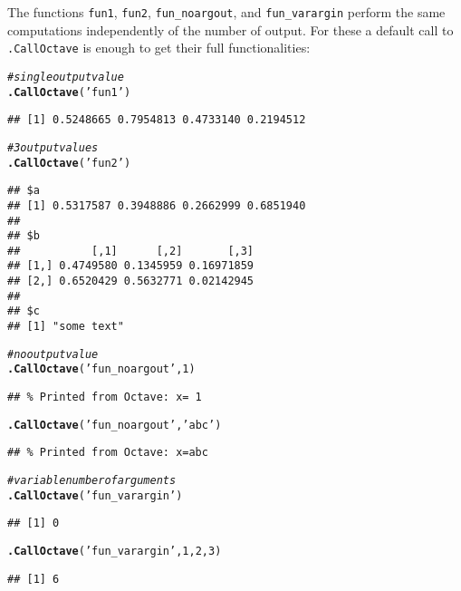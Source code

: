 \documentclass[english,10pt,a4paper]{article}\usepackage[]{graphicx}\usepackage[]{color}
\makeatletter
\newcommand{\hlnum}[1]{\textcolor[rgb]{0.686,0.059,0.569}{#1}}%
\newcommand{\hlstr}[1]{\textcolor[rgb]{0.192,0.494,0.8}{#1}}%
\newcommand{\hlcom}[1]{\textcolor[rgb]{0.678,0.584,0.686}{\textit{#1}}}%
\newcommand{\hlstd}[1]{\textcolor[rgb]{0.345,0.345,0.345}{#1}}%
\newcommand{\hlkwd}[1]{\textcolor[rgb]{0.737,0.353,0.396}{\textbf{#1}}}%
\newenvironment{kframe}{%
 \def\at@end@of@kframe{}%
 \ifinner\ifhmode%
  \def\at@end@of@kframe{\end{minipage}}%
  \begin{minipage}{\columnwidth}%
 \fi\fi%
 \def\FrameCommand##1{\hskip\@totalleftmargin \hskip-\fboxsep
 \colorbox{shadecolor}{##1}\hskip-\fboxsep
     \hskip-\linewidth \hskip-\@totalleftmargin \hskip\columnwidth}%
 \MakeFramed {\advance\hsize-\width
   \@totalleftmargin\z@ \linewidth\hsize
   \@setminipage}}%
 {\par\unskip\endMakeFramed%
 \at@end@of@kframe}
\newenvironment{knitrout}{}{} %
\let\code=\texttt
\makeatother
\begin{document}
The functions \code{fun1}, \code{fun2}, \code{fun\_noargout}, and
\code{fun\_varargin} perform the same computations independently of the number
of output.
For these a default call to \code{.CallOctave} is enough to get their full
functionalities:

\begin{knitrout}
\color{fgcolor}\begin{kframe}
\begin{alltt}
\hlcom{# single output value}
\hlkwd{.CallOctave}\hlstd{(}\hlstr{'fun1'}\hlstd{)}
\end{alltt}
\begin{verbatim}
## [1] 0.5248665 0.7954813 0.4733140 0.2194512
\end{verbatim}
\begin{alltt}
\hlcom{# 3 output values }
\hlkwd{.CallOctave}\hlstd{(}\hlstr{'fun2'}\hlstd{)}
\end{alltt}
\begin{verbatim}
## $a
## [1] 0.5317587 0.3948886 0.2662999 0.6851940
## 
## $b
##           [,1]      [,2]       [,3]
## [1,] 0.4749580 0.1345959 0.16971859
## [2,] 0.6520429 0.5632771 0.02142945
## 
## $c
## [1] "some text"
\end{verbatim}
\begin{alltt}
\hlcom{# no output value}
\hlkwd{.CallOctave}\hlstd{(}\hlstr{'fun_noargout'}\hlstd{,} \hlnum{1}\hlstd{)}
\end{alltt}
\begin{verbatim}
## % Printed from Octave: x= 1
\end{verbatim}
\begin{alltt}
\hlkwd{.CallOctave}\hlstd{(}\hlstr{'fun_noargout'}\hlstd{,} \hlstr{'abc'}\hlstd{)}
\end{alltt}
\begin{verbatim}
## % Printed from Octave: x=abc
\end{verbatim}
\begin{alltt}
\hlcom{# variable number of arguments}
\hlkwd{.CallOctave}\hlstd{(}\hlstr{'fun_varargin'}\hlstd{)}
\end{alltt}
\begin{verbatim}
## [1] 0
\end{verbatim}
\begin{alltt}
\hlkwd{.CallOctave}\hlstd{(}\hlstr{'fun_varargin'}\hlstd{,} \hlnum{1}\hlstd{,} \hlnum{2}\hlstd{,} \hlnum{3}\hlstd{)}
\end{alltt}
\begin{verbatim}
## [1] 6
\end{verbatim}
\end{kframe}
\end{knitrout}
\end{document}
